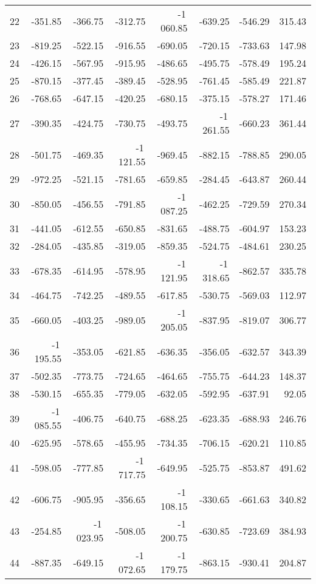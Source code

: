 \begin{longtable}{rrrrrrrr}
22 & -351.85 & -366.75 & -312.75 & -1\,060.85 & -639.25 & -546.29 & 315.43  \\
23 & -819.25 & -522.15 & -916.55 & -690.05 & -720.15 & -733.63 & 147.98  \\
24 & -426.15 & -567.95 & -915.95 & -486.65 & -495.75 & -578.49 & 195.24  \\
25 & -870.15 & -377.45 & -389.45 & -528.95 & -761.45 & -585.49 & 221.87  \\
26 & -768.65 & -647.15 & -420.25 & -680.15 & -375.15 & -578.27 & 171.46  \\
27 & -390.35 & -424.75 & -730.75 & -493.75 & -1\,261.55 & -660.23 & 361.44  \\
28 & -501.75 & -469.35 & -1\,121.55 & -969.45 & -882.15 & -788.85 & 290.05  \\
29 & -972.25 & -521.15 & -781.65 & -659.85 & -284.45 & -643.87 & 260.44  \\
30 & -850.05 & -456.55 & -791.85 & -1\,087.25 & -462.25 & -729.59 & 270.34  \\
31 & -441.05 & -612.55 & -650.85 & -831.65 & -488.75 & -604.97 & 153.23  \\
32 & -284.05 & -435.85 & -319.05 & -859.35 & -524.75 & -484.61 & 230.25  \\
33 & -678.35 & -614.95 & -578.95 & -1\,121.95 & -1\,318.65 & -862.57 & 335.78  \\
34 & -464.75 & -742.25 & -489.55 & -617.85 & -530.75 & -569.03 & 112.97  \\
35 & -660.05 & -403.25 & -989.05 & -1\,205.05 & -837.95 & -819.07 & 306.77  \\
36 & -1\,195.55 & -353.05 & -621.85 & -636.35 & -356.05 & -632.57 & 343.39  \\
37 & -502.35 & -773.75 & -724.65 & -464.65 & -755.75 & -644.23 & 148.37  \\
38 & -530.15 & -655.35 & -779.05 & -632.05 & -592.95 & -637.91 & 92.05  \\
39 & -1\,085.55 & -406.75 & -640.75 & -688.25 & -623.35 & -688.93 & 246.76  \\
40 & -625.95 & -578.65 & -455.95 & -734.35 & -706.15 & -620.21 & 110.85  \\
41 & -598.05 & -777.85 & -1\,717.75 & -649.95 & -525.75 & -853.87 & 491.62  \\
42 & -606.75 & -905.95 & -356.65 & -1\,108.15 & -330.65 & -661.63 & 340.82  \\
43 & -254.85 & -1\,023.95 & -508.05 & -1\,200.75 & -630.85 & -723.69 & 384.93  \\
44 & -887.35 & -649.15 & -1\,072.65 & -1\,179.75 & -863.15 & -930.41 & 204.87  \\

\end{longtable}

